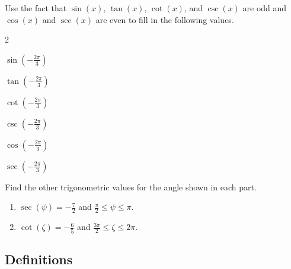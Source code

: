 \begin{myPractice}
	Use the fact that $\sin(x)$, $\tan(x)$, $\cot(x)$, and $\csc(x)$ are odd and $\cos(x)$ and $\sec(x)$ are even to fill in the following values.
	\begin{enumerate}
	\end{enumerate}
\end{myPractice}
\vfill

\newpage

\begin{myPractice}
	Find the other trigonometric values for the angle shown in each part.
	\begin{enumerate} 
		\item $\sec(\psi)=-\frac{7}{2}$ and $\frac{\pi}{2}\le\psi\le\pi$.
		\vfill
		\item $\cot(\zeta)=-\frac{6}{5}$ and $\frac{3\pi}{2}\le\zeta\le2\pi$.
		\vfill
	\end{enumerate}
\end{myPractice}

\newpage

\subsection*{Definitions} \label{def-other-trigonometric-functions}

